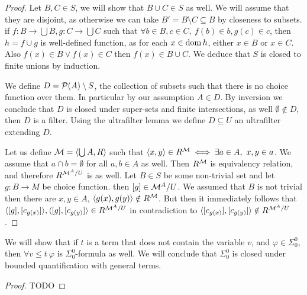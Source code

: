 \begin{proof}
	Let $B, C \in S$, we will show that $B \cup C \in S$ as well.
	We will assume that they are disjoint, as otherwise we can take $B' = B \setminus C \subseteq B$ by closeness to subsets.
	if $f : B \to \bigcup B, g : C \to \bigcup C$ such that $\forall b \in B, c \in C,\ f(b) \in b, g(c) \in c$, then $h = f \cup g$ is well-defined function,
	as for each $x \in \operatorname{dom} h$, either $x \in B$ or $x \in C$.
	Also $f(x) \in B \lor f(x) \in C$ then $f(x) \in B \cup C$.
	We deduce that $S$ is closed to finite unions by induction.

	We define $D = \mathcal{P}(A) \setminus S$, the collection of subsets such that there is no choice function over them. In particular by our assumption $A \in D$.
	By inversion we conclude that $D$ is closed under super-sets and finite intersections, as well $\emptyset \notin D$, then $D$ is a filter.
	Using the ultrafilter lemma we define $D \subseteq U$ an ultrafilter extending $D$.

	Let us define $\mathcal{M} = \langle \bigcup A, R \rangle$ such that $\langle x, y \rangle \in R^{\mathcal{M}} \iff \exists a \in A,\ x, y \in a$.
	We assume that $a \cap b = \emptyset$ for all $a, b \in A$ as well.
	Then $R^{\mathcal{M}}$ is equivalency relation, and therefore $R^{\mathcal{M}^A / U}$ is as well.
	Let $B \in S$ be some non-trivial set and let $g : B \to M$ be choice function.
	then $[g] \in \mathcal{M}^A / U$.
	We assumed that $B$ is not trivial then there are $x, y \in A$, $\langle g(x), g(y) \rangle \notin R^{\mathcal{M}}$.
	But then it immediately follows that $\langle [g], [c_{g(x)}] \rangle, \langle [g], [c_{g(y)}] \rangle \in R^{\mathcal{M}^A / U}$ in contradiction to $\langle [c_{g(x)}], [c_{g(y)}] \rangle \notin R^{\mathcal{M}^A / U}$.
\end{proof}

\question{}
We will show that if $t$ is a term that does not contain the variable $v$, and $\varphi \in \Sigma_0^0$,
then $\forall v \le t\ \varphi$ is $\Sigma_0^0$-formula as well.
We will conclude that $\Sigma_0^0$ is closed under bounded quantification with general terms.
\begin{proof}
	TODO
\end{proof}

